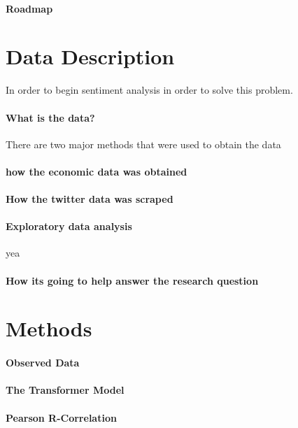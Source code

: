 \documentclass[12pt]{article}
\begin{document}
\paragraph{Roadmap}


\section{Data Description}
In order to begin sentiment analysis in order to solve this problem.
\paragraph{What is the data?}
There are two major methods that were used to obtain the data
\paragraph{how the economic data was obtained}

\paragraph{How the twitter data was scraped}

\paragraph{Exploratory data analysis}
yea 
\paragraph{How its going to help answer the research question}


\section{Methods}

\paragraph{Observed Data}

\paragraph{The Transformer Model}

\paragraph{Pearson R-Correlation}
\end{document}

